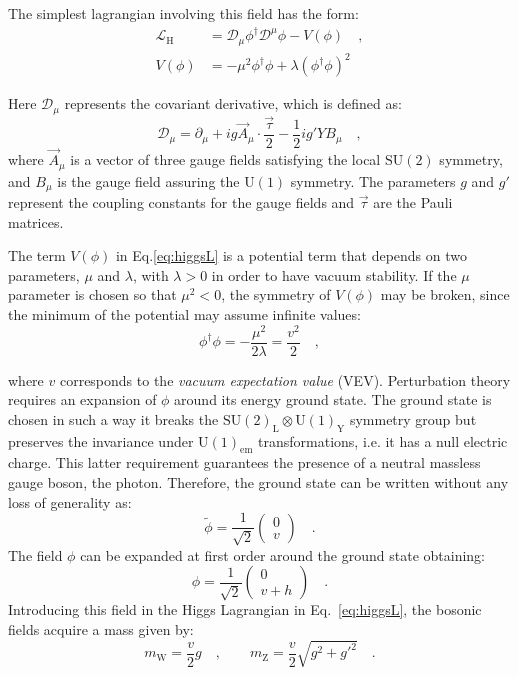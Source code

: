 \noindent The simplest lagrangian involving this field has the form:
\begin{equation}\label{eq:higgsL}
\begin{split}
\mathcal{L}_\mathrm{H} &= \mathcal{D}_\mu \phi^\dagger \mathcal{D}^\mu \phi - V(\phi) \quad,\\
V(\phi) &= -\mu^2\phi^\dagger\phi + \lambda(\phi^\dagger\phi)^2
\end{split}
\end{equation}

\noindent Here $\mathcal{D}_\mu$ represents the covariant derivative, which is defined as:
\begin{equation}
\mathcal{D}_\mu = \partial_\mu + i g \vec{A}_\mu \cdot \frac{\vec{\tau}}{2} - \frac{1}{2}i g' Y B_\mu \quad ,
\end{equation}
\noindent where $\vec{A}_\mu$ is a vector of three gauge fields satisfying the local $\mathrm{SU(2)}$ symmetry, and $B_\mu$ is the gauge field assuring the $\mathrm{U(1)}$ symmetry. The parameters $g$ and $g'$ represent the coupling constants for the gauge fields and $\vec{\tau}$ are the Pauli matrices.

The term $V(\phi)$ in Eq.\eqref{eq:higgsL} is a potential term that depends on two parameters, $\mu$ and $\lambda$, with $\lambda>0$ in order to have vacuum stability. If the $\mu$ parameter is chosen so that $\mu^2<0$, the symmetry of $V(\phi)$ may be broken, since the minimum of the potential may assume infinite values:
\begin{equation}
\phi^\dagger\phi = -\frac{\mu^2}{2\lambda} = \frac{v^2}{2} \quad ,
\end{equation}

\noindent where $v$ corresponds to the \emph{vacuum expectation value} (VEV). Perturbation theory requires an expansion of $\phi$ around its energy ground state. The ground state is chosen in such a way it  breaks the $\mathrm{SU(2)_L \otimes U(1)_Y}$ symmetry group but preserves the invariance under $\mathrm{U(1)_{em}}$ transformations, i.e. it has a null electric charge. This latter requirement guarantees the presence of a neutral massless gauge boson, the photon. Therefore, the ground state can be written without any loss of generality as:
\begin{equation}
\tilde{\phi} = \frac{1}{\sqrt{2}} \begin{pmatrix} 0 \\ v   \end{pmatrix}\quad .
\end{equation}
The field $\phi$ can be expanded at first order around the ground state obtaining:
\begin{equation}
\phi = \frac{1}{\sqrt{2}} \begin{pmatrix} 0 \\ v+h   \end{pmatrix}\quad .
\end{equation}
Introducing this field in the Higgs Lagrangian in Eq.~\eqref{eq:higgsL}, the bosonic fields acquire a mass given by:
\begin{equation}
m_\mathrm{W} = \frac{v}{2}g \quad, \qquad m_\mathrm{Z} = \frac{v}{2}\sqrt{g^2 +g'^2} \quad.
\end{equation}

